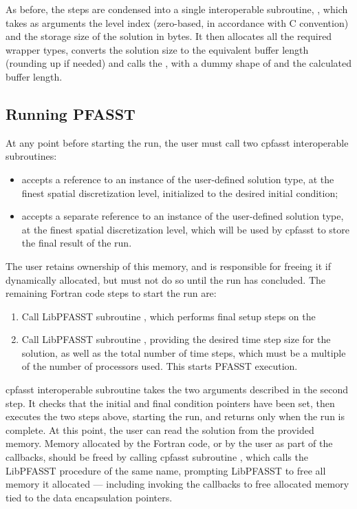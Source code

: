 As before, the steps are condensed into a single interoperable subroutine, , which takes as arguments the level index (zero-based, in accordance with C convention) and the storage size of the solution in bytes. It then allocates all the required wrapper types, converts the solution size to the equivalent buffer length (rounding up if needed) and calls the , with a dummy shape of \ilc{[1]} and the calculated buffer length.

\subsection{Running PFASST}

At any point before starting the run, the user must call two cpfasst interoperable subroutines:
\begin{itemize}
    \item {} accepts a reference to an instance of the user-defined solution type, at the finest spatial discretization level,  initialized to the desired initial condition;
    \item {} accepts a separate reference to an instance of the user-defined solution type, at the finest spatial discretization level, which will be used by cpfasst to store the final result of the run.
\end{itemize}
The user retains ownership of this memory, and is responsible for freeing it if dynamically allocated, but must not do so until the run has concluded. The remaining Fortran code steps to start the run are:
\begin{enumerate}
    \item Call LibPFASST subroutine , which performs final setup steps on the 
    \item Call LibPFASST subroutine , providing the desired time step size for the solution, as well as the total number of time steps, which must be a multiple of the number of processors used. This starts PFASST execution.
\end{enumerate}

cpfasst interoperable subroutine  takes the two arguments described in the second step. It checks that the initial and final condition pointers have been set, then executes the two steps above, starting the run, and returns only when the run is complete. At this point, the user can read the solution from the provided memory. Memory allocated by the Fortran code, or by the user as part of the  callbacks, should be freed by calling cpfasst subroutine , which calls the LibPFASST procedure of the same name, prompting LibPFASST to free all memory it allocated --- including invoking the  callbacks to free allocated memory tied to the data encapsulation pointers.


